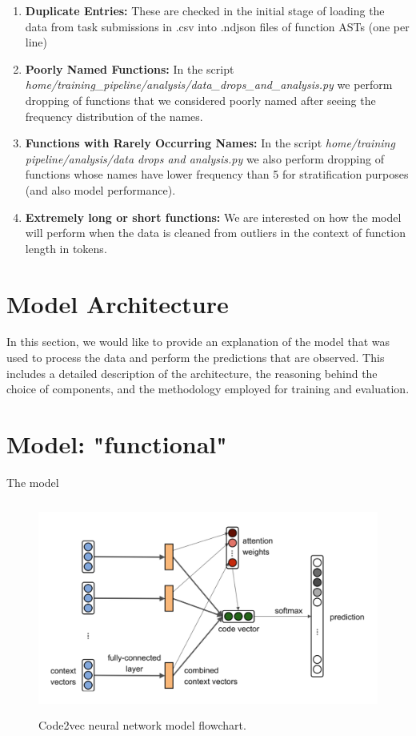 \documentclass[10pt,english,a4paper]{report}
\begin{document}
\begin{enumerate}
    \item \textbf{Duplicate Entries:} These are checked in the initial  stage of loading the data from task submissions in .csv into .ndjson files of function ASTs (one per line)
    \item \textbf{Poorly Named Functions:} In the script \textit{home/training\_pipeline/analysis/data\_drops\_and\_analysis.py} we perform dropping of functions that we considered poorly named after seeing the frequency distribution of the names.
    \item \textbf{Functions with Rarely Occurring Names:}  In the script \textit{home/training pipeline/analysis/data drops and analysis.py} we also perform dropping of functions whose names have lower frequency than 5 for stratification purposes (and also model performance).
    \item \textbf{Extremely long or short functions:} We are interested on how the model will
    perform when the data is cleaned from outliers in the context of function length in tokens.
\end{enumerate}


\section{Model Architecture}
In this section, we would like to provide an explanation of the model that was used to process the data and perform the predictions that are observed. This includes a detailed description of the architecture, the reasoning behind the choice of components, and the methodology employed for training and evaluation.

\section*{Model: "functional"}
The model 
\begin{figure}[H]
    \centering
    \includegraphics[width=12cm, height=7cm]{figures/code2vec_model_visual.png} 
    \caption{Code2vec \cite{code2vec} neural network model flowchart.}
    \label{fig:func_lengths_distr_merged}
\end{figure}
\end{document}
